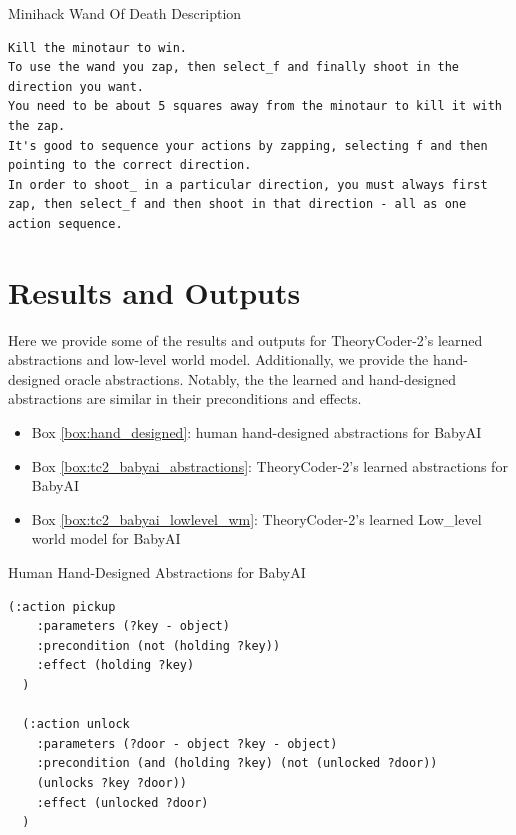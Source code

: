 \documentclass{article}
\theoremstyle{plain}
\theoremstyle{definition}
\theoremstyle{remark}
\begin{document}
\begin{mybox}[boxrule=0pt, parbox=false, opacityframe=1, colframe=black, label=box:minihack_wod_description]{Minihack Wand Of Death Description}
\begin{lstlisting}[basicstyle=\ttfamily\small, breaklines=true]
Kill the minotaur to win. 
To use the wand you zap, then select_f and finally shoot in the direction you want.
You need to be about 5 squares away from the minotaur to kill it with the zap.
It's good to sequence your actions by zapping, selecting f and then pointing to the correct direction.
In order to shoot_ in a particular direction, you must always first zap, then select_f and then shoot in that direction - all as one action sequence.
\end{lstlisting}

\end{mybox}

\section{Results and Outputs}

Here we provide some of the results and outputs for TheoryCoder-2's learned abstractions and low-level world model. Additionally, we provide the hand-designed oracle abstractions. Notably, the  the learned and hand-designed abstractions are similar in their preconditions and effects.

\begin{itemize}
\item Box \ref{box:hand_designed}: human hand-designed abstractions for BabyAI
\item Box \ref{box:tc2_babyai_abstractions}: TheoryCoder-2's learned abstractions for BabyAI
\item Box \ref{box:tc2_babyai_lowlevel_wm}: TheoryCoder-2's learned Low\_level world model for BabyAI
\end{itemize}


\begin{mybox}[boxrule=0pt, parbox=false, opacityframe=1, colframe=black, label=box:hand_designed]{Human Hand-Designed Abstractions for BabyAI}
\begin{lstlisting}[basicstyle=\ttfamily\small, breaklines=true]
 (:action pickup
    :parameters (?key - object)
    :precondition (not (holding ?key))
    :effect (holding ?key)
  )

  (:action unlock
    :parameters (?door - object ?key - object)
    :precondition (and (holding ?key) (not (unlocked ?door))
    (unlocks ?key ?door))
    :effect (unlocked ?door)
  )
\end{lstlisting}

\end{mybox}
\end{document}
